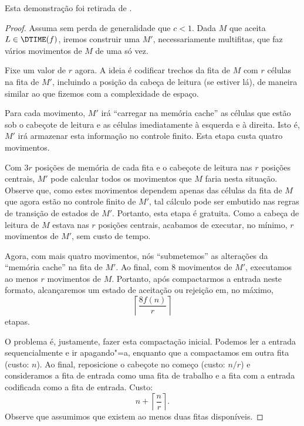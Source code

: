 Esta demonstração foi retirada de \cite[p. 290]{HopcroftUllman1979}.

\begin{proof}
    Assuma sem perda de generalidade que $c < 1$.
    Dada $M$ que aceita $L \in \DTIME(f)$,
    iremos construir uma $M'$,
    necessariamente multifitas,
    que faz vários movimentos de $M$ de uma só vez.

    Fixe um valor de $r$ agora.
    A ideia é codificar trechos da fita de $M$
    com $r$ células
    na fita de $M'$,
    incluindo a posição da cabeça de leitura
    (se estiver lá),
    de maneira similar ao que fizemos com a complexidade de espaço.

    Para cada movimento,
    $M'$ irá ``carregar na memória cache''
    as células que estão sob o cabeçote de leitura
    e as células imediatamente à esquerda e à direita.
    Isto é, $M'$ irá armazenar esta informação
    no controle finito.
    Esta etapa custa quatro movimentos.

    Com $3r$ posições de memória de cada fita
    e o cabeçote de leitura nas $r$ posições centrais,
    $M'$ pode calcular todos os movimentos que $M$ faria nesta situação.
    Observe que,
    como estes movimentos dependem apenas
    das células da fita de $M$
    que agora estão no controle finito de $M'$,
    tal cálculo pode ser embutido nas regras de transição de estados de $M'$.
    Portanto, esta etapa é gratuita.
    Como a cabeça de leitura de $M$ estava nas $r$ posições centrais,
    acabamos de executar,
    no mínimo,
    $r$ movimentos de $M'$,
    sem custo de tempo.

    Agora, com mais quatro movimentos,
    nós ``submetemos'' as alterações da ``memória cache''
    na fita de $M'$.
    Ao final, com $8$ movimentos de $M'$,
    executamos ao menos $r$ movimentos de $M$.
    Portanto, após compactarmos a entrada
    neste formato,
    alcançaremos um estado de aceitação ou rejeição
    em, no máximo,
    \begin{equation*}
        \left\lceil \frac{8f(n)}{r} \right\rceil
    \end{equation*}
    etapas.

    O problema é,
    justamente,
    fazer esta compactação inicial.
    Podemos ler a entrada sequencialmente
    e ir apagando"=a,
    enquanto que a compactamos em outra fita
    (custo: $n$).
    Ao final,
    reposicione o cabeçote no começo
    (custo: $n/r$)
    e consideramos a fita de entrada como uma fita de trabalho
    e a fita com a entrada codificada
    como a fita de entrada.
    Custo:
    \begin{equation*}
        n + \left\lceil \frac n r \right\rceil.
    \end{equation*}
    Observe que assumimos
    que existem ao menos duas fitas disponíveis.


\end{proof}
